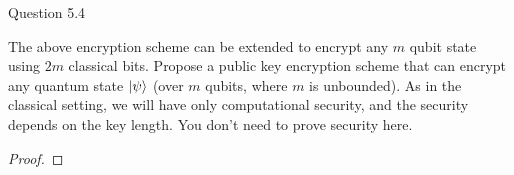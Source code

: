 \begin{solution}{Question 5.4}\label{ques:5.4}
    \begin{question}
    The above encryption scheme can be extended to encrypt any $m$ qubit state using $2m$ classical bits. Propose a public key encryption scheme that can encrypt any quantum state $\ket{\psi}$ (over $m$ qubits, where $m$ is unbounded). As in the classical setting, we will have only computational security, and the security depends on the key length. You don’t need to prove security here.
    \end{question}
    \tcblower{}
    \begin{proof}
    \end{proof}
\end{solution}
